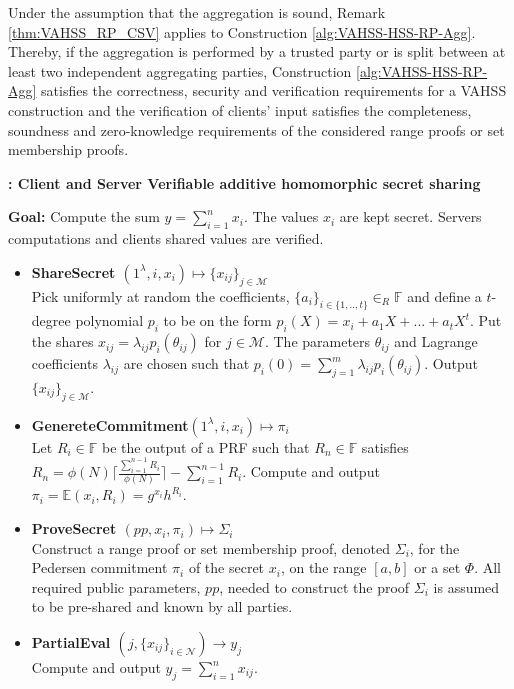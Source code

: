 Under the assumption that the aggregation is sound, Remark \ref{thm:VAHSS_RP_CSV} applies to Construction \ref{alg:VAHSS-HSS-RP-Agg}. Thereby, if the aggregation is performed by a trusted party or is split between at least two independent aggregating parties, Construction \ref{alg:VAHSS-HSS-RP-Agg} satisfies the correctness, security and verification requirements for a VAHSS construction and the verification of clients' input satisfies the completeness, soundness and zero-knowledge requirements of the considered range proofs or set membership proofs. 

\begin{algorithm}
\caption{\textbf{: Client and Server Verifiable additive homomorphic secret sharing}}

\textbf{Goal:} Compute the sum $y = \sum_{i=1}^n x_i$. The values $x_i$ are kept secret. Servers computations and clients shared values are verified. 
\vspace{2pt}
\hline
\vspace{2pt}
\begin{itemize}
 \item\textbf{ShareSecret $(1^\lambda,i,x_i) \mapsto \{x_{ij}\}_{j\in\mathcal{M}}$} \\
Pick uniformly at random the coefficients, $\{a_i\}_{i\in\{1,..,t\}}\in_R\mathds{F}$ and define a $t$-degree polynomial $p_i$ to be on the form $p_i(X) = x_i + a_1X+...+a_tX^t$. Put the shares $x_{ij}=\lambda_{ij}p_i(\theta_{ij})$ for $j\in\mathcal{M}$.  The parameters $\theta_{ij}$ and Lagrange coefficients $\lambda_{ij}$ are chosen such that $ p_i(0) = \sum_{j=1}^m \lambda_{ij}p_i(\theta_{ij})$.
Output $\{x_{ij}\}_{j\in\mathcal{M}}$.

\item\textbf{GenereteCommitment$(1^\lambda,i,x_i) \mapsto \pi_i$ }\\
Let $R_i\in\mathds{F}$ be the output of a PRF such that $R_n\in \mathds{F}$  satisfies $R_n = \phi(N)\lceil \frac{\sum_{i=1}^{n-1}R_i}{\phi(N)}\rceil- \sum_{i=1}^{n-1}R_i $. Compute and output $\pi_i = \mathds{E}(x_i,R_i)= g^{x_i}h^{R_i}$.

\item\textbf{ProveSecret $(pp,x_i,\pi_i) \mapsto \Sigma_i$}\\
Construct a range proof or set membership proof, denoted $\Sigma_i$, for the Pedersen commitment $\pi_i$ of the secret $x_i$, on the  range $[a,b]$ or a set $\Phi$. All required public parameters, $pp$, needed to  construct the proof $\Sigma_i$ is assumed to be pre-shared and known by all parties.
\item\textbf{PartialEval $(j,\{x_{ij}\}_{i\in\mathcal{N}})\xrightarrow[]{}y_j$}\\
Compute and output $y_j = \sum_{i=1}^n x_{ij}$.


\end{itemize}
\end{algorithm}
